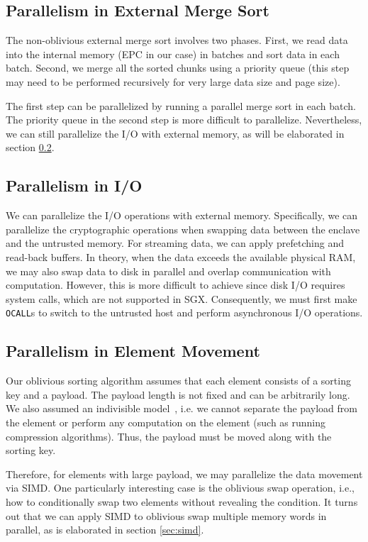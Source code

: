 \documentclass{article}
\begin{document}
\subsection{Parallelism in External Merge Sort}
The non-oblivious external merge sort involves two phases. First, we read data into the internal memory (EPC in our case) in batches and sort data in each batch. Second, we merge all the sorted chunks using a priority queue (this step may need to be performed recursively for very large data size and page size).

The first step can be parallelized by running a parallel merge sort in each batch. The priority queue in the second step is more difficult to parallelize. Nevertheless, we can still parallelize the I/O with external memory, as will be elaborated in section \ref{sec:parallelize I/O}.

\subsection{Parallelism in I/O}
\label{sec:parallelize I/O}
We can parallelize the I/O operations with external memory. Specifically, we can parallelize the cryptographic operations when swapping data between the enclave and the untrusted memory. For streaming data, we can apply prefetching and read-back buffers. In theory, when the data exceeds the available physical RAM, we may also swap data to disk in parallel and overlap communication with computation. However, this is more difficult to achieve since disk I/O requires system calls, which are not supported in SGX. Consequently, we must first make {\tt OCALL}s to switch to the untrusted host and perform asynchronous I/O operations.

\subsection{Parallelism in Element Movement}
Our oblivious sorting algorithm assumes that each element consists of a sorting key and a payload. The payload length is not fixed and can be arbitrarily long. We also assumed an indivisible model~\cite{osortsmallkey}, i.e. we cannot separate the payload from the element or perform any computation on the element (such as running compression algorithms). Thus, the payload must be moved along with the sorting key.

Therefore, for elements with large payload, we may parallelize the data movement via SIMD. One particularly interesting case is the oblivious swap operation, i.e., how to conditionally swap two elements without revealing the condition. It turns out that we can apply SIMD to oblivious swap multiple memory words in parallel, as is elaborated in section \ref{sec:simd}.
\end{document}
